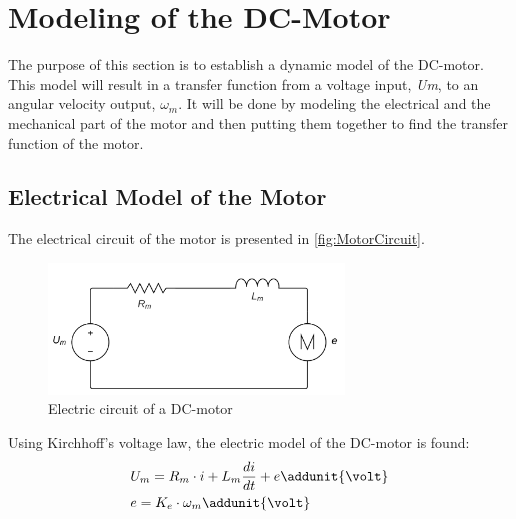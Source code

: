 \section{Modeling of the DC-Motor}

The purpose of this section is to establish a dynamic model of the DC-motor. This model will result in a transfer function from a voltage input, \textit{Um}, to an angular velocity output, \textit{$\omega_m$}. It will be done by modeling the electrical and the mechanical part of the motor and then putting them together to find the transfer function of the motor.

\subsection*{Electrical Model of the Motor}
The electrical circuit of the motor is presented in \autoref{fig:MotorCircuit}.

\begin{figure}[htbp]
	\centering
 	\includegraphics[width=0.7\textwidth]{figures/modeling/Motor/MotorElectricCircuit.pdf} 
 	\caption{Electric circuit of a DC-motor}
 	\label{fig:MotorCircuit}
\end{figure}

Using Kirchhoff's voltage law, the electric model of the DC-motor is found:
\begin{subequations} \label{eq:tech_ToA}
	\begin{flalign}
		&U_m = R_m \cdot i + L_m \frac{di}{dt} + e \addunit{\volt} \\
		&e = K_e \cdot \omega_m \addunit{\volt}
	\end{flalign}
\end{subequations}

\startexplain
\stopexplain

